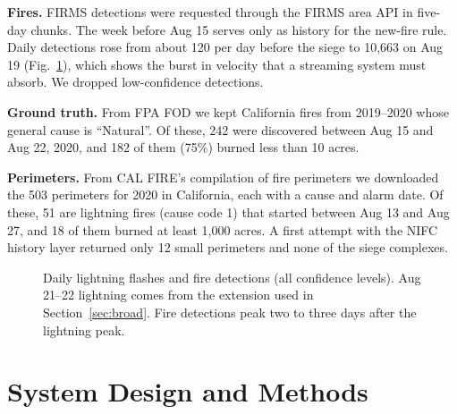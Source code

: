 \documentclass[10pt,journal,compsoc]{IEEEtran}
\begin{document}
\textbf{Fires.} FIRMS detections were requested through the FIRMS area API in five-day chunks. The week before Aug 15 serves only as history for the new-fire rule. Daily detections rose from about 120 per day before the siege to 10,663 on Aug 19 (Fig.~\ref{fig:daily}), which shows the burst in velocity that a streaming system must absorb. We dropped low-confidence detections.

\textbf{Ground truth.} From FPA FOD we kept California fires from 2019--2020 whose general cause is ``Natural''. Of these, 242 were discovered between Aug 15 and Aug 22, 2020, and 182 of them (75\%) burned less than 10 acres.

\textbf{Perimeters.} From CAL FIRE's compilation of fire perimeters we downloaded the 503 perimeters for 2020 in California, each with a cause and alarm date. Of these, 51 are lightning fires (cause code 1) that started between Aug 13 and Aug 27, and 18 of them burned at least 1,000 acres. A first attempt with the NIFC history layer returned only 12 small perimeters and none of the siege complexes.

\begin{figure}[!t]
\centering
{}
\caption{Daily lightning flashes and fire detections (all confidence levels). Aug 21--22 lightning comes from the extension used in Section~\ref{sec:broad}. Fire detections peak two to three days after the lightning peak.}
\label{fig:daily}
\end{figure}

\section{System Design and Methods}\label{sec:methods}
\end{document}
